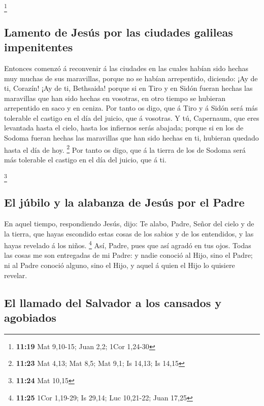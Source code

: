 \footnote{\textbf{11:19} Mat 9,10-15; Juan 2,2; 1Cor 1,24-30}

\hypertarget{lamento-de-jesuxfas-por-las-ciudades-galileas-impenitentes}{%
\subsection{Lamento de Jesús por las ciudades galileas
impenitentes}\label{lamento-de-jesuxfas-por-las-ciudades-galileas-impenitentes}}

 Entonces comenzó á reconvenir á las ciudades en las
cuales habían sido hechas muy muchas de sus maravillas, porque no se
habían arrepentido, diciendo:  ¡Ay de ti, Corazín! ¡Ay de
ti, Bethsaida! porque si en Tiro y en Sidón fueran hechas las maravillas
que han sido hechas en vosotras, en otro tiempo se hubieran arrepentido
en saco y en ceniza.  Por tanto os digo, que á Tiro y á
Sidón será más tolerable el castigo en el día del juicio, que á
vosotras.  Y tú, Capernaum, que eres levantada hasta el
cielo, hasta los infiernos serás abajada; porque si en los de Sodoma
fueran hechas las maravillas que han sido hechas en ti, hubieran quedado
hasta el día de hoy. \footnote{\textbf{11:23} Mat 4,13; Mat 8,5; Mat
  9,1; Is 14,13; Is 14,15}  Por tanto os digo, que á la
tierra de los de Sodoma será más tolerable el castigo en el día del
juicio, que á ti.

\footnote{\textbf{11:24} Mat 10,15}

\hypertarget{el-juxfabilo-y-la-alabanza-de-jesuxfas-por-el-padre}{%
\subsection{El júbilo y la alabanza de Jesús por el
Padre}\label{el-juxfabilo-y-la-alabanza-de-jesuxfas-por-el-padre}}

 En aquel tiempo, respondiendo Jesús, dijo: Te alabo,
Padre, Señor del cielo y de la tierra, que hayas escondido estas cosas
de los sabios y de los entendidos, y las hayas revelado á los niños.
\footnote{\textbf{11:25} 1Cor 1,19-29; Is 29,14; Luc 10,21-22; Juan
  17,25}  Así, Padre, pues que así agradó en tus ojos.
 Todas las cosas me son entregadas de mi Padre: y nadie
conoció al Hijo, sino el Padre; ni al Padre conoció alguno, sino el
Hijo, y aquel á quien el Hijo lo quisiere revelar.

\hypertarget{el-llamado-del-salvador-a-los-cansados-y-agobiados}{%
\subsection{El llamado del Salvador a los cansados
\hspace{0pt}\hspace{0pt}y
agobiados}\label{el-llamado-del-salvador-a-los-cansados-y-agobiados}}

